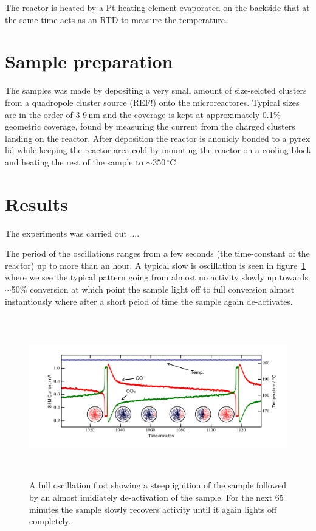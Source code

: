 \documentclass[8.5pt,twoside,twocolumn]{article}
\begin{document}
The reactor is heated by a Pt heating element evaporated on the backside that at the same time acts as an RTD to measure the temperature. 

\section{Sample preparation}
The samples was made by depositing a very small amount of size-selcted clusters from a quadropole cluster source (REF!) onto the microreactores. Typical sizes are in the order of 3-9\,nm and the coverage is kept at approximately 0.1\% geometric coverage, found by measuring the current from the charged clusters landing on the reactor. After deposition the reactor is anonicly bonded to a pyrex lid while keeping the reactor area cold by mounting the reactor on a cooling block and heating the rest of the sample to $\sim350\,^\circ$C \cite{Vesborg2010}

\section{Results}
The experiments was carried out ....

The period of the oscillations ranges from a few seconds (the time-constant of the reactor) up to more than an hour. A typical slow is oscillation is seen in figure~\ref{fgr:full_oscillation} where we see the typical pattern going from almost no activity slowly up towards $\sim$50\% conversion at which point the sample light off to full conversion almost instantiously where after a short peiod of time the sample again de-activates.
\begin{figure}
  \centering
  \includegraphics[height=7cm]{single_full_oscillation.png}
  \caption{A full oscillation first showing a steep ignition of the sample followed by an almost imidiately de-activation of the sample. For the next 65\,minutes the sample slowly recovers activity until it again lights off completely.}
  \label{fgr:full_oscillation}
\end{figure}
\end{document}

